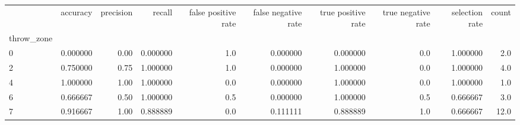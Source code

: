 \begin{tabular}{lrrrrrrrrr}
\toprule
{} &  accuracy &  precision &    recall &  false positive rate &  false negative rate &  true positive rate &  true negative rate &  selection rate &  count \\
throw\_zone &           &            &           &                      &                      &                     &                     &                 &        \\
\midrule
0          &  0.000000 &       0.00 &  0.000000 &                  1.0 &             0.000000 &            0.000000 &                 0.0 &        1.000000 &    2.0 \\
2          &  0.750000 &       0.75 &  1.000000 &                  1.0 &             0.000000 &            1.000000 &                 0.0 &        1.000000 &    4.0 \\
4          &  1.000000 &       1.00 &  1.000000 &                  0.0 &             0.000000 &            1.000000 &                 0.0 &        1.000000 &    1.0 \\
6          &  0.666667 &       0.50 &  1.000000 &                  0.5 &             0.000000 &            1.000000 &                 0.5 &        0.666667 &    3.0 \\
7          &  0.916667 &       1.00 &  0.888889 &                  0.0 &             0.111111 &            0.888889 &                 1.0 &        0.666667 &   12.0 \\
\bottomrule
\end{tabular}

